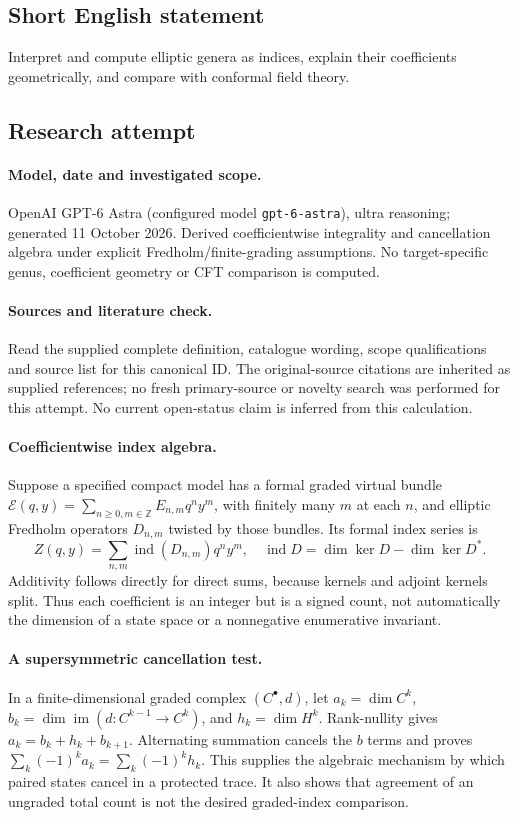 \documentclass[11pt]{article}
\begin{document}
\subsection{Short English statement}
Interpret and compute elliptic genera as indices, explain their coefficients geometrically, and compare with conformal field theory.
\subsection{Research attempt}
\paragraph{Model, date and investigated scope.}
OpenAI GPT-6 Astra (configured model \texttt{gpt-6-astra}), ultra reasoning; generated 11 October 2026. Derived coefficientwise integrality and cancellation algebra under explicit Fredholm/finite-grading assumptions. No target-specific genus, coefficient geometry or CFT comparison is computed.

\paragraph{Sources and literature check.}
Read the supplied complete definition, catalogue wording, scope qualifications and source list for this canonical ID. The original-source citations are inherited as supplied references; no fresh primary-source or novelty search was performed for this attempt. No current open-status claim is inferred from this calculation.

\paragraph{Coefficientwise index algebra.}Suppose a specified compact model has a formal graded virtual bundle \(\mathcal E(q,y)=\sum_{n\ge0,m\in\mathbb Z}E_{n,m}q^ny^m\), with finitely many \(m\) at each \(n\), and elliptic Fredholm operators \(D_{n,m}\) twisted by those bundles. Its formal index series is
\[Z(q,y)=\sum_{n,m}\operatorname{ind}(D_{n,m})q^ny^m,\quad
\operatorname{ind}D=\dim\ker D-\dim\ker D^*.
\]
Additivity follows directly for direct sums, because kernels and adjoint kernels split. Thus each coefficient is an integer but is a signed count, not automatically the dimension of a state space or a nonnegative enumerative invariant.
\paragraph{A supersymmetric cancellation test.}In a finite-dimensional graded complex \((C^\bullet,d)\), let \(a_k=\dim C^k\), \(b_k=\dim\operatorname{im}(d:C^{k-1}\to C^k)\), and \(h_k=\dim H^k\). Rank-nullity gives \(a_k=b_k+h_k+b_{k+1}\). Alternating summation cancels the \(b\) terms and proves \(\sum_k(-1)^ka_k=\sum_k(-1)^kh_k\). This supplies the algebraic mechanism by which paired states cancel in a protected trace. It also shows that agreement of an ungraded total count is not the desired graded-index comparison.
\end{document}
